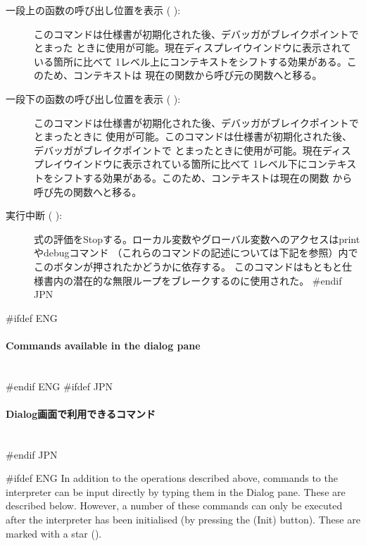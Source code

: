 \documentclass[\pformat,12pt]{article}
\newcommand{\subsubsubsection}[1]{\paragraph{#1}\mbox{}\\}
\newcommand{\guicmd}[1]{{\sf #1}}
\newcommand{\guicmd}[1]{{\gt #1}}
\begin{document}
\begin{description}
\item[\guicmd{一段上の函数の呼び出し位置を表示} (\hspace{-1.8mm}
):] 
このコマンドは仕様書が初期化された後、デバッガがブレイクポイントでとまった
ときに使用が可能。現在ディスプレイウインドウに表示されている箇所に比べて
1レベル上にコンテキストをシフトする効果がある。このため、コンテキストは
現在の関数から呼び元の関数へと移る。

\item[\guicmd{一段下の函数の呼び出し位置を表示} (\hspace{-1.8mm}
):]
このコマンドは仕様書が初期化された後、デバッガがブレイクポイントでとまったときに
使用が可能。このコマンドは仕様書が初期化された後、デバッガがブレイクポイントで
とまったときに使用が可能。現在ディスプレイウインドウに表示されている箇所に比べて
1レベル下にコンテキストをシフトする効果がある。このため、コンテキストは現在の関数
から呼び先の関数へと移る。

\item[\guicmd{実行中断} (\hspace{-1.8mm}
):] 
  式の評価をStopする。ローカル変数やグローバル変数へのアクセスは\guicmd{print}や\guicmd{debug}コマンド
  （これらのコマンドの記述については下記を参照）内でこのボタンが押されたかどうかに依存する。
  このコマンドはもともと仕様書内の潜在的な無限ループをブレークするのに使用された。
#endif JPN
\end{description}

#ifdef ENG
\subsubsubsection{Commands available in the dialog pane}
#endif ENG
#ifdef JPN
\subsubsubsection{Dialog画面で利用できるコマンド}
#endif JPN

#ifdef ENG
In addition to the operations described above, commands to the
interpreter can be input directly by typing them in the
\guicmd{Dialog} pane. These are described below. However, a number of
these commands can only be executed after the interpreter has
been initialised (by pressing the
(\guicmd{Init}) button).  These are
marked with a star ({\tt *}).
\end{document}
